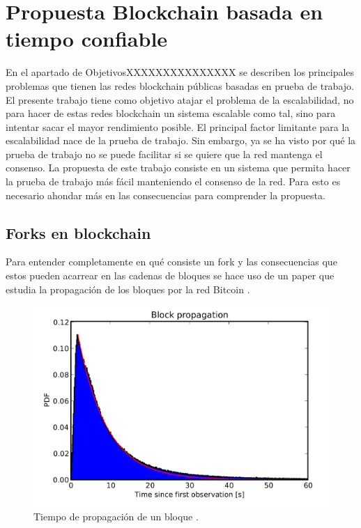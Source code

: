 \chapter{Propuesta Blockchain basada en tiempo confiable}
En el apartado de ObjetivosXXXXXXXXXXXXXXX se describen los principales problemas que tienen las redes blockchain públicas basadas en prueba de trabajo. El presente trabajo tiene como objetivo atajar el problema de la escalabilidad, no para hacer de estas redes blockchain un sistema escalable como tal, sino para intentar sacar el mayor rendimiento posible. El principal factor limitante para la escalabilidad nace de la prueba de trabajo. Sin embargo, ya se ha visto por qué la prueba de trabajo no se puede facilitar si se quiere que la red mantenga el consenso. La propuesta de este trabajo consiste en un sistema que permita hacer la prueba de trabajo más fácil manteniendo el consenso de la red. Para esto es necesario ahondar más en las consecuencias para comprender la propuesta.

\section{Forks en blockchain}
Para entender completamente en qué consiste un fork y las consecuencias que estos pueden acarrear en las cadenas de bloques se hace uso de un paper que estudia la propagación de los bloques por la red Bitcoin \cite{forks}.

\begin{figure}
	\centering
	\includegraphics[width=1\textwidth]{imagenes/figura1.PNG}
	\caption{\label{fig1}Tiempo de propagación de un bloque \cite{forks}.}
\end{figure}

